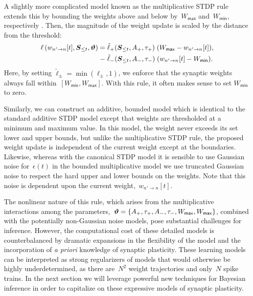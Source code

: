 A slightly more complicated model known as the multiplicative STDP
rule extends this by bounding the weights above and below
by~$W_{\mathsf{max}}$ and~$W_{\mathsf{min}}$, respectively
\cite{Morrison-2008}. Then, the magnitude of the weight update is
scaled by the distance from the threshold:
\begin{align}
 \label{eqn:MultSTDP}
 \ell\left(w_{n' \to n}[t], \boldsymbol{S}_{\leq t}, \boldsymbol{\vartheta} \right) = 
     &\;\tilde\ell_+(\boldsymbol{S}_{\leq t}, A_+, \tau_+) \; (W_{\mathsf{max}}-w_{n'\to n}[t]), \nonumber \\
   - &\;\tilde\ell_-(\boldsymbol{S}_{\leq t}, A_-, \tau_-) \; (w_{n'\to n}[t]-W_{\mathsf{min}}).
\end{align}
Here, by setting ${\tilde\ell_\pm = \min(\ell_\pm,1)}$, we enforce
that the synaptic weights always fall
within~${[W_{\mathsf{min}}, W_{\mathsf{max}}]}$. With this rule, it
often makes sense to set $W_{\mathsf{min}}$ to zero.

Similarly, we can construct an additive, bounded model which is
identical to the standard additive STDP model except that weights are
thresholded at a minimum and maximum value. In this model, the weight
never exceeds its set lower and upper bounds, but unlike the
multiplicative STDP rule, the proposed weight update is independent of
the current weight except at the boundaries. Likewise, whereas with
the canonical STDP model it is sensible to use Gaussian noise
for~$\epsilon(t)$ in the bounded multiplicative model we use truncated
Gaussian noise to respect the hard upper and lower bounds on the
weights.  Note that this noise is dependent upon the current
weight,~$w_{n'\to n}[t]$.

The nonlinear nature of this rule, which arises from the
multiplicative interactions among the parameters,~${\boldsymbol{\vartheta} =
  \{A_+,\tau_+,A_-,\tau_-,W_{\mathsf{max}}, W_{\mathsf{max}}\}}$,
combined with the potentially non-Gaussian noise models, pose
substantial challenges for inference. However, the computational cost
of these detailed models is counterbalanced by dramatic expansions in
the flexibility of the model and the incorporation of \emph{a priori}
knowledge of synaptic plasticity. These learning models can be
interpreted as strong regularizers of models that would otherwise be
highly underdetermined, as there are~$N^2$ weight trajectories and
only~$N$ spike trains. In the next section we will leverage powerful
new techniques for Bayesian inference in order to capitalize on these
expressive models of synaptic plasticity.

